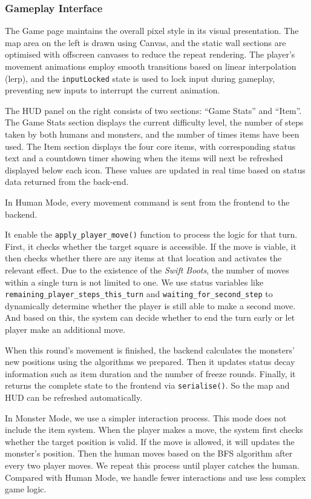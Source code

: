 \documentclass[12pt,a4paper]{article}
\begin{document}
\subsubsection{Gameplay Interface}

The Game page maintains the overall pixel style in its visual presentation. The map area on the left is drawn using Canvas, and the static wall sections are optimised with offscreen canvases to reduce the repeat rendering. The player's movement animations employ smooth transitions based on linear interpolation (lerp), and the \texttt{inputLocked} state is used to lock input during gameplay, preventing new inputs to interrupt the current animation.

The HUD panel on the right consists of two sections: ``Game Stats'' and ``Item''. The Game Stats section displays the current difficulty level, the number of steps taken by both humans and monsters, and the number of times items have been used. The Item section displays the four core items, with corresponding status text and a countdown timer showing when the items will next be refreshed displayed below each icon. These values are updated in real time based on status data returned from the back-end.

In Human Mode, every movement command is sent from the frontend to the backend.

It enable the \texttt{apply\_player\_move()} function to process the logic for that turn. First, it checks whether the target square is accessible. If the move is viable, it then checks whether there are any items at that location and activates the relevant effect. Due to the existence of the \textit{Swift Boots}, the number of moves within a single turn is not limited to one. We use status variables like \texttt{remaining\_player\_steps\_this\_turn} and \texttt{waiting\_for\_second\_step} to dynamically determine whether the player is still able to make a second move. And based on this, the system can decide whether to end the turn early or let player make an additional move.

When this round's movement is finished, the backend calculates the monsters' new positions using the algorithms we prepared. Then it updates status decay information such as item duration and the number of freeze rounds. Finally, it returns the complete state to the frontend via \texttt{serialise()}. So the map and HUD can be refreshed automatically.

In Monster Mode, we use a simpler interaction process. This mode does not include the item system. When the player makes a move, the system first checks whether the target position is valid. If the move is allowed, it will updates the monster's position. Then the human moves based on the BFS algorithm after every two player moves. We repeat this process until player catches the human. Compared with Human Mode, we handle fewer interactions and use less complex game logic.
\end{document}
